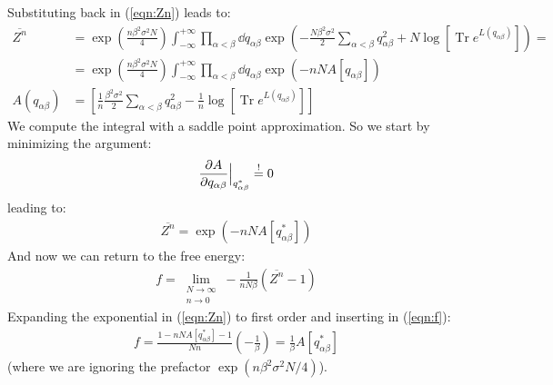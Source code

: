 \documentclass[../template.tex]{subfiles}
\begin{document}
Substituting back in (\ref{eqn:Zn}) leads to:
\begin{align*}
    \overline{Z^n} &= \exp\left(\frac{n \beta^2 \sigma^2 N}{4} \right) \int_{-\infty}^{+\infty} \prod_{\alpha < \beta} \dd{q_{\alpha \beta}} \exp\left(-\frac{N \beta^2 \sigma^2}{2} \sum_{\alpha < \beta} q_{\alpha \beta}^2 + N \log [\operatorname{Tr} e^{L(q_{\alpha \beta})} ]\right) =\\
    &= \exp\left(\frac{n \beta^2 \sigma^2 N}{4}\right) \int_{-\infty}^{+\infty} \prod_{\alpha < \beta} \dd{q_{\alpha \beta}} \exp\left(- n N A[q_{\alpha \beta}]\right)\\
    A(q_{\alpha \beta}) &= \left[\frac{1}{n} \frac{\beta^2 \sigma^2}{2} \sum_{\alpha < \beta} q_{\alpha \beta}^2 - \frac{1}{n} \log[\operatorname{Tr} e^{L(q_{\alpha \beta})} ]   \right]
\end{align*}
We compute the integral with a saddle point approximation. So we start by minimizing the argument:
\begin{align*}
    \pdv{A}{q_{\alpha \beta}} (q_{\alpha \beta}) \Big|_{q_{\alpha \beta}^*} \overset{!}{=} 0
\end{align*}
leading to:
\begin{align}
    \overline{Z^n} = \exp\left(-n N A [q_{\alpha \beta}^*]\right)
    \label{eqn:Zn2}
\end{align}
And now we can return to the free energy:
\begin{align}
    f = \lim_{\substack{N \to \infty\\ n \to 0}} -\frac{1}{n N \beta}(\overline{Z^n} - 1) \label{eqn:f}
\end{align}
Expanding the exponential in (\ref{eqn:Zn}) to first order and inserting in (\ref{eqn:f}):
\begin{align*}
    f = \frac{1-n N A[q_{\alpha \beta}^*] - 1}{N n} (-\frac{1}{\beta} ) = \frac{1}{\beta}  A[q_{\alpha \beta}^*]
\end{align*}
(where we are ignoring the prefactor $\exp(n \beta^2 \sigma^2 N /4)$).

\medskip
\end{document}
